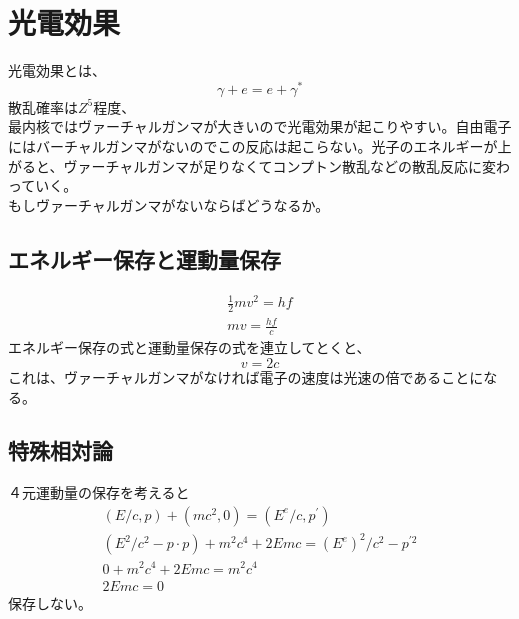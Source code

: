 \documentclass{jsarticle}
\begin{document}
\section{光電効果}
光電効果とは、
\begin{equation}
    \gamma + e = e + \gamma^{*}
\end{equation}
散乱確率は$Z^5$程度、\\
最内核ではヴァーチャルガンマが大きいので光電効果が起こりやすい。自由電子にはバーチャルガンマがないのでこの反応は起こらない。光子のエネルギーが上がると、ヴァーチャルガンマが足りなくてコンプトン散乱などの散乱反応に変わっていく。\\
もしヴァーチャルガンマがないならばどうなるか。
\subsection{エネルギー保存と運動量保存}
\begin{align}
    \frac{1}{2} m v^2 = hf\\
    mv = \frac{hf}{c}
\end{align}
エネルギー保存の式と運動量保存の式を連立してとくと、
\begin{equation}
    v = 2c
\end{equation}
これは、ヴァーチャルガンマがなければ電子の速度は光速の倍であることになる。
\subsection{特殊相対論}
４元運動量の保存を考えると
\begin{align}
    (E/c, p) + (mc^2, 0) = (E^e /c, p^\prime)\\
    (E^2/c^2 - p \cdot p) + m^2 c^4 + 2 Emc = (E^e)^2 / c^2 - p^{\prime 2}\\
    0 + m^2 c^4 + 2Emc = m^2 c^4 \\
    2Emc = 0
\end{align}
保存しない。
\end{document}

